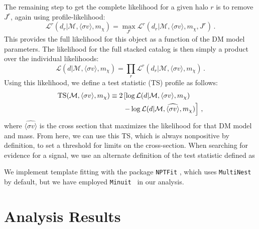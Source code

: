 The remaining step to get the complete likelihood for a given halo $r$ is to remove $J^r$, again using profile-likelihood:
\begin{equation}
\mathcal{L}^r(d_r | \mathcal{M}, \langle \sigma v \rangle, m_\chi) = \max_{J^r} \mathcal{L}^r(d_r | \mathcal{M}, \langle \sigma v \rangle, m_\chi, J^r)\,.
\end{equation}
This provides the full likelihood for this object as a function of the DM model parameters.  The likelihood for the full stacked catalog is then simply a product over the individual likelihoods:
\begin{equation}
\mathcal{L}(d | \mathcal{M}, \langle \sigma v \rangle, m_\chi) = \prod_r \mathcal{L}^r(d_r | \mathcal{M}, \langle \sigma v \rangle, m_\chi)\,.
\label{eq:likelihoodobjprod}
\end{equation}
Using this likelihood, we define a test statistic (TS) profile as follows:
\begin{equation}\begin{aligned}
{\rm TS}(\mathcal{M}, \langle\sigma v\rangle, m_\chi) \equiv 2 &\left[ \log \mathcal{L}(d | \mathcal{M}, \langle\sigma v\rangle, m_\chi ) \right.\\
&\left.- \log \mathcal{L}(d | \mathcal{M}, \widehat{\langle\sigma v\rangle}, m_\chi ) \right]\,,
\label{eq:TSdef_darksky}
\end{aligned}\end{equation}
where $\widehat{\langle\sigma v\rangle}$ is the cross section that maximizes the likelihood for that DM model and mass. From here, we can use this TS, which is always nonpositive by definition, to set a threshold for limits on the cross-section.  When searching for evidence for a signal, we use an alternate definition of the test statistic defined as 

We implement template fitting with the package \texttt{NPTFit} \cite{Mishra-Sharma:2016gis}, which uses \texttt{MultiNest}~\cite{Feroz:2008xx,Buchner:2014nha} by default, but we have employed \texttt{Minuit}~\cite{James:1975dr} in our analysis.

\section{Analysis Results}
\label{sec:smallrois}

